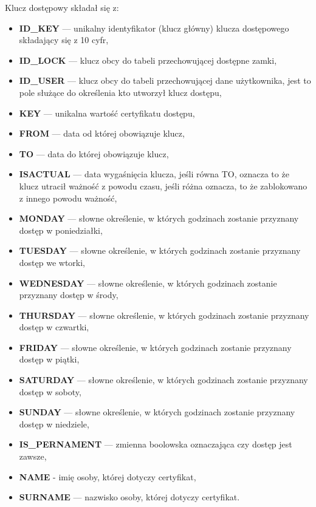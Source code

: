 	Klucz dostępowy składał się z:
	\begin{itemize}
		\item \textbf{ID\_KEY} --- unikalny identyfikator (klucz główny) klucza dostępowego składający się z 10 cyfr,
		\item \textbf{ID\_LOCK} --- klucz obcy do tabeli przechowującej dostępne zamki,
		\item \textbf{ID\_USER} --- klucz obcy do tabeli przechowującej dane użytkownika, jest to pole służące do określenia kto utworzył klucz dostępu,
		\item \textbf{KEY} --- unikalna wartość certyfikatu dostępu,
		\item \textbf{FROM} --- data od której obowiązuje klucz,
		\item \textbf{TO} --- data do której obowiązuje klucz,
		\item \textbf{ISACTUAL} --- data wygaśnięcia klucza, jeśli równa TO, oznacza to że klucz utracił ważność z powodu czasu, jeśli różna oznacza, to że zablokowano z innego powodu ważność,
		\item \textbf{MONDAY} --- słowne określenie, w których godzinach zostanie przyznany dostęp w poniedziałki,
		\item \textbf{TUESDAY} --- słowne określenie, w których godzinach zostanie przyznany dostęp we wtorki,
		\item \textbf{WEDNESDAY} --- słowne określenie, w których godzinach zostanie przyznany dostęp w środy,
		\item \textbf{THURSDAY} --- słowne określenie, w których godzinach zostanie przyznany dostęp w czwartki,
		\item \textbf{FRIDAY} --- słowne określenie, w których godzinach zostanie przyznany dostęp w piątki,
		\item \textbf{SATURDAY} --- słowne określenie, w których godzinach zostanie przyznany dostęp w soboty,
		\item \textbf{SUNDAY} --- słowne określenie, w których godzinach zostanie przyznany dostęp w niedziele,
		\item \textbf{IS\_PERNAMENT} --- zmienna boolowska oznaczająca czy dostęp jest zawsze,
		\item \textbf{NAME} - imię osoby, której dotyczy certyfikat,
		\item \textbf{SURNAME} --- nazwisko osoby, której dotyczy certyfikat.
	\end{itemize}
	
